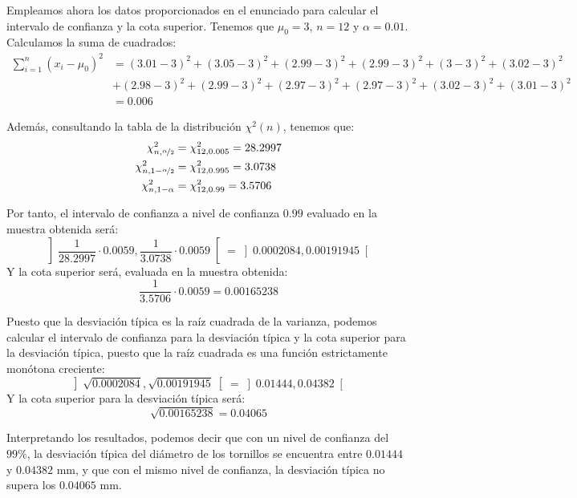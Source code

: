 \begin{ejercicio}
    Empleamos ahora los datos proporcionados en el enunciado para calcular el intervalo de confianza y la cota superior. Tenemos que $\mu_0=3$, $n=12$ y $\alpha = 0.01$. Calculamos la suma de cuadrados:
    \begin{align*}
        \sum_{i=1}^{n}{(x_i - \mu_0)}^{2} &= (3.01-3)^2 + (3.05-3)^2 + (2.99-3)^2 + (2.99-3)^2 + (3-3)^2 + (3.02-3)^2 \\
        &+ (2.98-3)^2 + (2.99-3)^2 + (2.97-3)^2 + (2.97-3)^2 + (3.02-3)^2 + (3.01-3)^2 \\
        &= 0.006
    \end{align*}

    Además, consultando la tabla de la distribución $\chi^2(n)$, tenemos que:
    \begin{align*}
        \chi^2_{n,\nicefrac{\alpha}{2}} &= \chi^2_{12,0.005} = 28.2997 \\
        \chi^2_{n,1-\nicefrac{\alpha}{2}} &= \chi^2_{12,0.995} = 3.0738 \\
        \chi^2_{n,1-\alpha} &= \chi^2_{12,0.99} = 3.5706
    \end{align*}

    Por tanto, el intervalo de confianza a nivel de confianza $0.99$ evaluado en la muestra obtenida será:
    \begin{equation*}
        \left]\frac{1}{28.2997} \cdot 0.0059, \frac{1}{3.0738} \cdot 0.0059\right[ = \left]0.0002084,0.00191945\right[
    \end{equation*}
    Y la cota superior será, evaluada en la muestra obtenida:
    \begin{equation*}
        \frac{1}{3.5706} \cdot 0.0059 = 0.00165238
    \end{equation*}

    Puesto que la desviación típica es la raíz cuadrada de la varianza, podemos calcular el intervalo de confianza para la desviación típica y la cota superior para la desviación típica, puesto que la raíz cuadrada es una función estrictamente monótona creciente:
    \begin{equation*}
        \left]\sqrt{0.0002084},\sqrt{0.00191945}\right[ = \left]0.01444,0.04382\right[
    \end{equation*}
    Y la cota superior para la desviación típica será:
    \begin{equation*}
        \sqrt{0.00165238} = 0.04065
    \end{equation*}

    Interpretando los resultados, podemos decir que con un nivel de confianza del $99\%$, la desviación típica del diámetro de los tornillos se encuentra entre $0.01444$ y $0.04382$ mm, y que con el mismo nivel de confianza, la desviación típica no supera los $0.04065$ mm.
\end{ejercicio}

